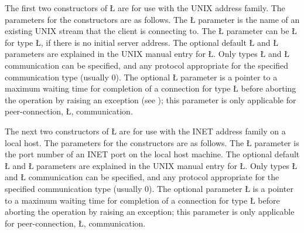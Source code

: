 \documentclass[openright,twoside]{report}
\begin{document}
The first two constructors of \LGinlinetrue\LGbegin\lgrinde\L{}\endlgrinde\LGend{} are for use with the UNIX address family.
The parameters for the constructors are as follows.
The \LGinlinetrue\LGbegin\lgrinde\L{}\endlgrinde\LGend{} parameter is the name of an existing UNIX stream that the client is connecting to.
The \LGinlinetrue\LGbegin\lgrinde\L{}\endlgrinde\LGend{} parameter can be \LGinlinetrue\LGbegin\lgrinde\L{}\endlgrinde\LGend{} for type \LGinlinetrue\LGbegin\lgrinde\L{}\endlgrinde\LGend{}, if there is no initial server address.
The optional default \LGinlinetrue\LGbegin\lgrinde\L{}\endlgrinde\LGend{} and \LGinlinetrue\LGbegin\lgrinde\L{}\endlgrinde\LGend{} parameters are explained in the UNIX manual entry for \LGinlinetrue\LGbegin\lgrinde\L{}\endlgrinde\LGend{}.
Only types \LGinlinetrue\LGbegin\lgrinde\L{}\endlgrinde\LGend{} and \LGinlinetrue\LGbegin\lgrinde\L{}\endlgrinde\LGend{} communication can be specified, and any protocol appropriate for the specified communication type (usually 0).
The optional \LGinlinetrue\LGbegin\lgrinde\L{}\endlgrinde\LGend{} parameter is a pointer to a maximum waiting time for completion of a connection for type \LGinlinetrue\LGbegin\lgrinde\L{}\endlgrinde\LGend{} before aborting the operation by raising an exception (see );
this parameter is only applicable for peer-connection, \LGinlinetrue\LGbegin\lgrinde\L{}\endlgrinde\LGend{}, communication.

The next two constructors of \LGinlinetrue\LGbegin\lgrinde\L{}\endlgrinde\LGend{} are for use with the INET address family on a local host.
The parameters for the constructors are as follows.
The \LGinlinetrue\LGbegin\lgrinde\L{}\endlgrinde\LGend{} parameter is the port number of an INET port on the local host machine.
The optional default \LGinlinetrue\LGbegin\lgrinde\L{}\endlgrinde\LGend{} and \LGinlinetrue\LGbegin\lgrinde\L{}\endlgrinde\LGend{} parameters are explained in the UNIX manual entry for \LGinlinetrue\LGbegin\lgrinde\L{}\endlgrinde\LGend{}.
Only types \LGinlinetrue\LGbegin\lgrinde\L{}\endlgrinde\LGend{} and \LGinlinetrue\LGbegin\lgrinde\L{}\endlgrinde\LGend{} communication can be specified, and any protocol appropriate for the specified communication type (usually 0).
The optional parameter \LGinlinetrue\LGbegin\lgrinde\L{}\endlgrinde\LGend{} is a pointer to a maximum waiting time for completion of a connection for type \LGinlinetrue\LGbegin\lgrinde\L{}\endlgrinde\LGend{} before aborting the operation by raising an exception;
this parameter is only applicable for peer-connection, \LGinlinetrue\LGbegin\lgrinde\L{}\endlgrinde\LGend{}, communication.
\end{document}
